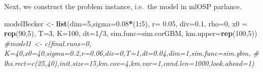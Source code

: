 \documentclass[]{article}
\newenvironment{Shaded}{\begin{snugshade}}{\end{snugshade}}
\newcommand{\KeywordTok}[1]{\textcolor[rgb]{0.13,0.29,0.53}{\textbf{#1}}}
\newcommand{\DataTypeTok}[1]{\textcolor[rgb]{0.13,0.29,0.53}{#1}}
\newcommand{\DecValTok}[1]{\textcolor[rgb]{0.00,0.00,0.81}{#1}}
\newcommand{\FloatTok}[1]{\textcolor[rgb]{0.00,0.00,0.81}{#1}}
\newcommand{\StringTok}[1]{\textcolor[rgb]{0.31,0.60,0.02}{#1}}
\newcommand{\CommentTok}[1]{\textcolor[rgb]{0.56,0.35,0.01}{\textit{#1}}}
\newcommand{\ControlFlowTok}[1]{\textcolor[rgb]{0.13,0.29,0.53}{\textbf{#1}}}
\newcommand{\OperatorTok}[1]{\textcolor[rgb]{0.81,0.36,0.00}{\textbf{#1}}}
\newcommand{\NormalTok}[1]{#1}
\begin{document}
\begin{Shaded}
\end{Shaded}

Next, we construct the problem instance, i.e.~the model in mlOSP
parlance.

\begin{Shaded}
\begin{Highlighting}[]
\NormalTok{modelBecker <-}\StringTok{ }\KeywordTok{list}\NormalTok{(}\DataTypeTok{dim=}\DecValTok{5}\NormalTok{,}\DataTypeTok{sigma=}\FloatTok{0.08}\OperatorTok{*}\NormalTok{(}\DecValTok{1}\OperatorTok{:}\DecValTok{5}\NormalTok{), }\DataTypeTok{r=} \FloatTok{0.05}\NormalTok{, }\DataTypeTok{div=}\FloatTok{0.1}\NormalTok{, }\DataTypeTok{rho=}\DecValTok{0}\NormalTok{, }\DataTypeTok{x0 =} \KeywordTok{rep}\NormalTok{(}\DecValTok{90}\NormalTok{,}\DecValTok{5}\NormalTok{), }\DataTypeTok{T=}\DecValTok{3}\NormalTok{, }\DataTypeTok{K=}\DecValTok{100}\NormalTok{, }\DataTypeTok{dt=}\DecValTok{1}\OperatorTok{/}\DecValTok{3}\NormalTok{, }
                    \DataTypeTok{sim.func=}\NormalTok{sim.corGBM, }\DataTypeTok{km.upper=}\KeywordTok{rep}\NormalTok{(}\DecValTok{100}\NormalTok{,}\DecValTok{5}\NormalTok{))}
\CommentTok{#model1 <- c(final.runs=0, K=40,x0=40,sigma=0.2,r=0.06,div=0,T=1,dt=0.04,dim=1,sim.func=sim.gbm,}
\CommentTok{# lhs.rect=c(25,40),init.size=15,km.cov=4,km.var=1,cand.len=1000,look.ahead=1)}
\end{Highlighting}
\end{Shaded}
\end{document}
